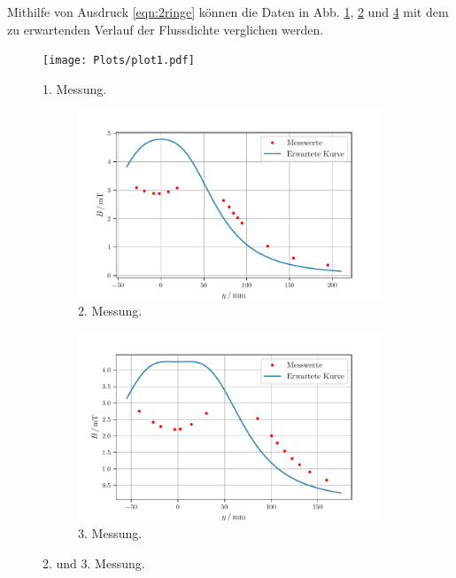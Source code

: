 Mithilfe von Ausdruck \eqref{eqn:2ringe} können die Daten in Abb. \ref{fig:1mess}, \ref{fig:2mess} und \ref{fig:3mess}  mit dem zu erwartenden Verlauf der Flussdichte verglichen werden.
\begin{figure}
    \centering
    \texttt{[image: Plots/plot1.pdf]}
    \caption{1. Messung.}
    \label{fig:1mess}
\end{figure}
\begin{figure}
    \centering
    \begin{subfigure}{0.48/textwidth}
        \centering
        \includegraphics[max width=1.1\linewidth]{Plots/plot2.pdf}
        \caption{2. Messung.}
        \label{fig:2mess}
    \end{subfigure}
    \begin{subfigure}{{0.48\textwidth}}
        \centering
        \includegraphics[max width=1.1\linewidth]{Plots/plot3.pdf}
        \caption{3. Messung.}
        \label{fig:3mess}
    \end{subfigure}
    \caption{2. und 3. Messung.}
\end{figure}
\pagebreak
